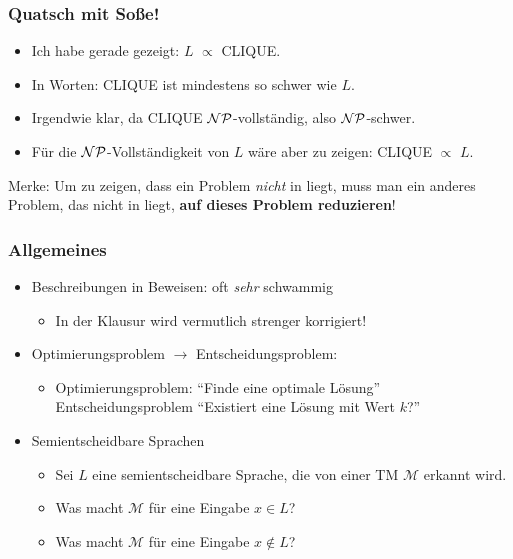 \begin{frame}
	\frametitle{Quatsch mit Soße!}
	
	\begin{itemize}
	\item	Ich habe gerade gezeigt: $L$ $\propto$ CLIQUE.
	\item In Worten: CLIQUE ist mindestens so schwer wie $L$.
	\item Irgendwie klar, da CLIQUE $\mathcal{NP}$-vollständig, also $\mathcal{NP}$-schwer.
	\item Für die $\mathcal{NP}$-Vollständigkeit von $L$ wäre aber zu zeigen: CLIQUE	$\propto$ $L$.
	\end{itemize} 
	
	\pause
	
	\begin{block}{Merke:}
	\alert{Um zu zeigen, dass ein Problem \textit{nicht} in \classP{} liegt, muss man ein anderes Problem, das nicht in \classP{} liegt, \textbf{auf dieses Problem reduzieren}!}
	\end{block}
\end{frame}

\vincible

\begin{frame}
	\frametitle{Allgemeines}
	
	\begin{itemize}
		\item Beschreibungen in Beweisen: oft \textit{sehr} schwammig
		\begin{itemize}
			\item In der Klausur wird vermutlich strenger korrigiert!
		\end{itemize}
		\pause \item Optimierungsproblem $\rightarrow$ Entscheidungsproblem:
		\begin{itemize}
			\item Optimierungsproblem: "`Finde eine optimale Lösung"' \\ Entscheidungsproblem "`Existiert eine Lösung mit Wert $k$?"'
		\end{itemize}
		\pause \item Semientscheidbare Sprachen
		\begin{itemize}
			\item Sei $L$ eine semientscheidbare Sprache, die von einer TM $\mathcal{M}$ erkannt wird.
			\item Was macht $\mathcal{M}$ für eine Eingabe $x \in L$?
			\pause \item Was macht $\mathcal{M}$ für eine Eingabe $x \not\in L$?
		\end{itemize}
	\end{itemize}
\end{frame}


